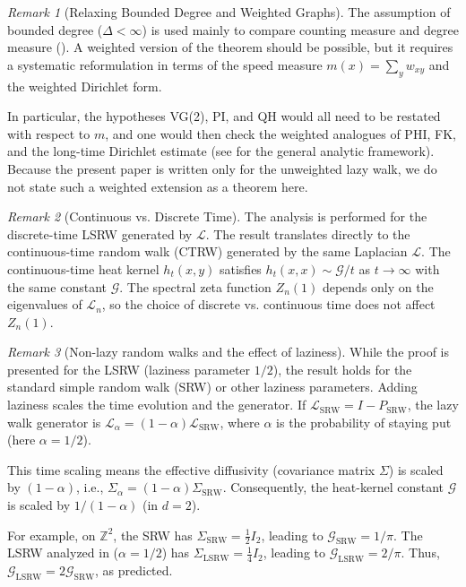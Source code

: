 \documentclass[reqno]{amsart}
\numberwithin{equation}{section}
\theoremstyle{definition}
\theoremstyle{remark}
\newtheorem{remark}[remark]{Remark}
\newcommand{\cG}{\mathcal{G}}
\newcommand{\LL}{\mathcal{L}}
\begin{document}
\begin{remark}[Relaxing Bounded Degree and Weighted Graphs]\label{rem:weighted}
The assumption of bounded degree ($\Delta < \infty$) is used mainly to compare counting measure and degree measure (). A weighted version of the theorem should be possible, but it requires a systematic reformulation in terms of the speed measure $m(x)=\sum_y w_{xy}$ and the weighted Dirichlet form.

In particular, the hypotheses VG(2), PI, and QH would all need to be restated with respect to $m$, and one would then check the weighted analogues of PHI, FK, and the long-time Dirichlet estimate (see \cite{Delmotte99} for the general analytic framework). Because the present paper is written only for the unweighted lazy walk, we do not state such a weighted extension as a theorem here.
\end{remark}


\begin{remark}[Continuous vs. Discrete Time]\label{rem:continuous_time}
The analysis is performed for the discrete-time LSRW generated by $\LL$. The result translates directly to the continuous-time random walk (CTRW) generated by the same Laplacian $\LL$. The continuous-time heat kernel $h_t(x,y)$ satisfies $h_t(x,x) \sim \cG/t$ as $t\to\infty$ with the same constant $\cG$. The spectral zeta function $Z_n(1)$ depends only on the eigenvalues of $\LL_n$, so the choice of discrete vs. continuous time does not affect $Z_n(1)$.
\end{remark}


\begin{remark}[Non-lazy random walks and the effect of laziness]\label{rem:non-lazy}
While the proof is presented for the LSRW (laziness parameter $1/2$), the result holds for the standard simple random walk (SRW) or other laziness parameters. Adding laziness scales the time evolution and the generator. If $\LL_{\text{SRW}} = I - P_{\text{SRW}}$, the lazy walk generator is $\LL_{\alpha} = (1-\alpha)\LL_{\text{SRW}}$, where $\alpha$ is the probability of staying put (here $\alpha=1/2$).

This time scaling means the effective diffusivity (covariance matrix $\Sigma$) is scaled by $(1-\alpha)$, i.e., $\Sigma_{\alpha} = (1-\alpha)\Sigma_{\text{SRW}}$. Consequently, the heat-kernel constant $\cG$ is scaled by $1/(1-\alpha)$ (in $d=2$).

For example, on $\mathbb{Z}^2$, the SRW has $\Sigma_{\text{SRW}} = \frac{1}{2} I_2$, leading to $\cG_{\text{SRW}} = 1/\pi$. The LSRW analyzed in  ($\alpha=1/2$) has $\Sigma_{\text{LSRW}} = \frac{1}{4} I_2$, leading to $\cG_{\text{LSRW}} = 2/\pi$. Thus, $\cG_{\text{LSRW}}=2\cG_{\text{SRW}}$, as predicted.
\end{remark}
\end{document}
